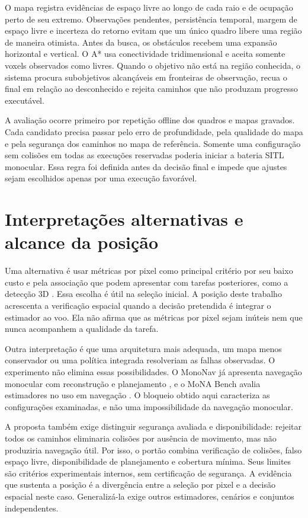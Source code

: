 O mapa registra evidências de espaço livre ao longo de cada raio e de ocupação perto de seu extremo. Observações pendentes, persistência temporal, margem de espaço livre e incerteza do retorno evitam que um único quadro libere uma região de maneira otimista. Antes da busca, os obstáculos recebem uma expansão horizontal e vertical. O A* usa conectividade tridimensional e aceita somente voxels observados como livres. Quando o objetivo não está na região conhecida, o sistema procura subobjetivos alcançáveis em fronteiras de observação, recua o final em relação ao desconhecido e rejeita caminhos que não produzam progresso executável.

A avaliação ocorre primeiro por repetição offline dos quadros e mapas gravados. Cada candidato precisa passar pelo erro de profundidade, pela qualidade do mapa e pela segurança dos caminhos no mapa de referência. Somente uma configuração sem colisões em todas as execuções reservadas poderia iniciar a bateria SITL monocular. Essa regra foi definida antes da decisão final e impede que ajustes sejam escolhidos apenas por uma execução favorável.

\section{Interpretações alternativas e alcance da posição}

Uma alternativa é usar métricas por pixel como principal critério por seu baixo custo e pela associação que podem apresentar com tarefas posteriores, como a detecção 3D \cite{Gurram2023DepthMetrics}. Essa escolha é útil na seleção inicial. A posição deste trabalho acrescenta a verificação espacial quando a decisão pretendida é integrar o estimador ao voo. Ela não afirma que as métricas por pixel sejam inúteis nem que nunca acompanhem a qualidade da tarefa.

Outra interpretação é que uma arquitetura mais adequada, um mapa menos conservador ou uma política integrada resolveriam as falhas observadas. O experimento não elimina essas possibilidades. O MonoNav já apresenta navegação monocular com reconstrução e planejamento \cite{Simon2024MonoNav}, e o MoNA Bench avalia estimadores no uso em navegação \cite{Pan2024MoNA}. O bloqueio obtido aqui caracteriza as configurações examinadas, e não uma impossibilidade da navegação monocular.

A proposta também exige distinguir segurança avaliada e disponibilidade: rejeitar todos os caminhos eliminaria colisões por ausência de movimento, mas não produziria navegação útil. Por isso, o portão combina verificação de colisões, falso espaço livre, disponibilidade de planejamento e cobertura mínima. Seus limites são critérios experimentais internos, sem certificação de segurança. A evidência que sustenta a posição é a divergência entre a seleção por pixel e a decisão espacial neste caso. Generalizá-la exige outros estimadores, cenários e conjuntos independentes.

